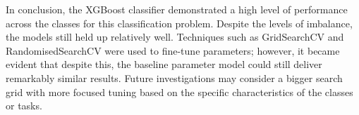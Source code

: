 In conclusion, the XGBoost classifier demonstrated a high level of performance across the classes for this classification problem. Despite the levels of imbalance, the models still held up relatively well. Techniques such as GridSearchCV and RandomisedSearchCV were used to fine-tune parameters; however, it became evident that despite this, the baseline parameter model could still deliver remarkably similar results. Future investigations may consider a bigger search grid with more focused tuning based on the specific characteristics of the classes or tasks.



%
%
